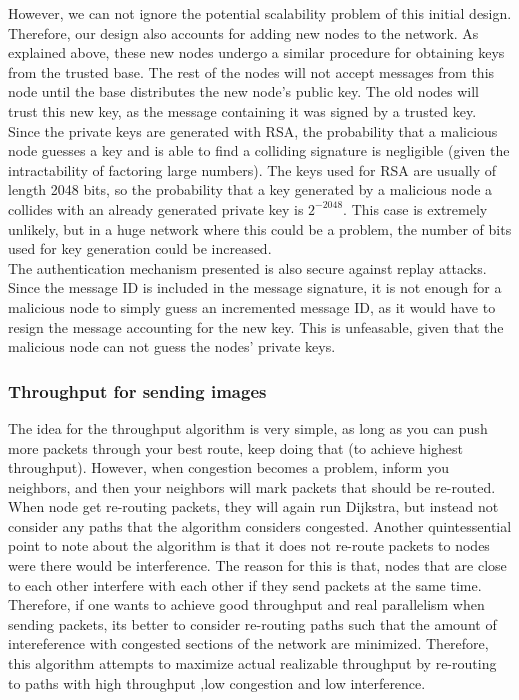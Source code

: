 \documentclass[letterpaper]{article}
\begin{document}
However, we can not ignore the potential scalability problem of this initial design. Therefore, our design also accounts for adding new nodes to the network. As explained above, these new nodes undergo a similar procedure for obtaining keys from the trusted base. The rest of the nodes will not accept messages from this node until the base distributes the new node's public key. The old nodes will trust this new key, as the message containing it was signed by a trusted key.
\\

Since the private keys are generated with RSA, the probability that a malicious node guesses a key and is able to find a colliding signature is negligible (given the intractability of factoring large numbers). The keys used for RSA are usually of length 2048 bits, so the probability that a key generated by a malicious node a collides with an already generated private key is $2^{-2048}$. This case is extremely unlikely, but in a huge network where this could be a problem, the number of bits used for key generation could be increased.\\

The authentication mechanism presented is also secure against replay attacks. Since the message ID is included in the message signature, it is not enough for a malicious node to simply guess an incremented message ID, as it would have to resign the message accounting for the new key. This is unfeasable, given that the malicious node can not guess the nodes' private keys.

\subsubsection{Throughput for sending images}

The idea for the throughput algorithm is very simple, as long as you can push more packets through your best route, keep doing that (to achieve highest throughput). However, when congestion becomes a problem, inform you neighbors, and then your neighbors will mark packets that should be re-routed. When node get re-routing packets, they will again run Dijkstra, but instead not consider any paths that the algorithm considers congested. Another quintessential point to note about the algorithm is that it does not re-route packets to nodes were there would be interference. The reason for this is that, nodes that are close to each other interfere with each other if they send packets at the same time. Therefore, if one wants to achieve good throughput and real parallelism when sending packets, its better to consider re-routing paths such that the amount of intereference with congested sections of the network are minimized. Therefore, this algorithm attempts to maximize actual realizable throughput by re-routing to paths with high throughput ,low congestion and low interference.
\end{document}
